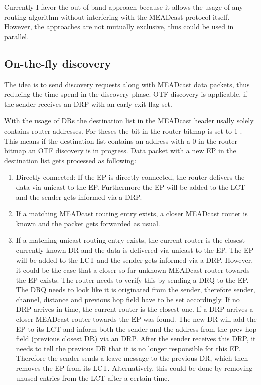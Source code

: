Currently I favor the out of band approach because it allows the usage of any
routing algorithm without interfering with the MEADcast protocol itself.
However, the approaches are not mutually exclusive, thus could be used in
parallel.


\subsection{On-the-fly discovery} %
\label{sub:On-the-fly discovery}
The idea is to send discovery requests along with MEADcast data packets, thus
reducing the time spend in the discovery phase.
OTF discovery is applicable, if the sender receives an DRP with an early exit
flag set.

With the usage of DRs the destination list in the MEADcast header usally
solely contains router addresses. For theses the bit in the router bitmap is set
to 1 \cite{meadcast2}.
This means if the destination list contains an address with a 0 in the router
bitmap an OTF discovery is in progress.
Data packet with a new EP in the destination list gets processed as following:
\begin{enumerate}
    \item Directly connected: If the EP is directly connected, the router
          delivers the data via unicast to the EP.
          Furthermore the EP will be added to the LCT and the sender gets
          informed via a DRP.
    \item If a matching MEADcast routing entry exists, a closer MEADcast router
          is known and the packet gets forwarded as usual.
    \item If a matching unicast routing entry exists, the current router is the
          closest currently known DR and the data is delivered via unicast to
          the EP.
          The EP will be added to the LCT and the sender gets informed via a
          DRP.
          However, it could be the case that a closer so far unknown MEADcast
          router towards the EP exists.
          The router needs to verify this by sending a DRQ to the EP.
          The DRQ needs to look like it is originated from the sender, therefore
          sender, channel, distance and previous hop field have to be set
          accordingly.
          If no DRP arrives in time, the current router is the closest one.
          If a DRP arrives a closer MEADcast router towards the EP was found.
          The new DR will add the EP to its LCT and inform both the sender and
          the address from the prev-hop field (previous closest DR) via an DRP.
          After the sender receives this DRP, it needs to tell the previous DR
          that it is no longer responsible for this EP.
          Therefore the sender sends a leave message to the previous DR, which
          then removes the EP from its LCT.
          Alternatively, this could be done by removing unused entries from the
          LCT after a certain time.
\end{enumerate}




